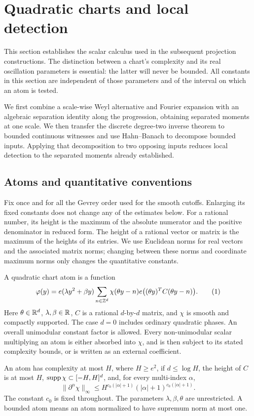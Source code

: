 \section{Quadratic charts and local detection}\label{sec:charts}

This section establishes the scalar calculus used in the subsequent
projection constructions.  The distinction between a chart's complexity
and its real oscillation parameters is essential: the latter will never
be bounded.  All constants in this section are independent of those
parameters and of the interval on which an atom is tested.

We first combine a scale-wise Weyl alternative and Fourier expansion
with an algebraic separation identity along the progression, obtaining
separated moments at one scale.  We then transfer the discrete
degree-two inverse theorem to bounded continuous witnesses and use
Hahn--Banach to decompose bounded inputs.  Applying that decomposition
to two opposing inputs reduces local detection to the separated moments
already established.

\subsection{Atoms and quantitative conventions}

Fix once and for all the Gevrey order used for the smooth cutoffs.
Enlarging its fixed constants does not change any of the estimates below.
For a rational number, its height is the maximum of the absolute
numerator and the positive denominator in reduced form.  The height of
a rational vector or matrix is the maximum of the heights of its entries.
We use Euclidean norms for real vectors and the associated matrix norms;
changing between these norms and coordinate maximum norms only changes
the quantitative constants.

\begin{definition}\label{def:quadratic-atom}
A quadratic chart atom is a function
\begin{equation*}
 \varphi(y)=e(\lambda y^2+\beta y)
 \sum_{n\in\mathbb Z^d}\chi(\theta y-n)
                 e\bigl((\theta y)^T C(\theta y-n)\bigr).
 \tag{1}\label{eq:src-1}
\end{equation*}
Here \(\theta\in\mathbb R^d\), \(\lambda,\beta\in\mathbb R\), \(C\) is a rational
\(d\)-by-\(d\) matrix, and \(\chi\) is smooth and compactly supported.
The case \(d=0\) includes ordinary quadratic phases.  An overall
unimodular constant factor is allowed.  Every non-unimodular scalar
multiplying an atom is either absorbed into \(\chi\), and is then
subject to its stated complexity bounds, or is written as an external
coefficient.

An atom has complexity at most \(H\), where \(H\ge e^2\), if
\(d\le\log H\), the height of \(C\) is at most \(H\),
\(\operatorname{supp}\chi\subset[-H,H]^d\), and, for every multi-index \(\alpha\),
\[
 \|\partial^\alpha\chi\|_\infty
 \le H^{c_0(|\alpha|+1)}
          (|\alpha|+1)^{c_0(|\alpha|+1)} .
\]
The constant \(c_0\) is fixed throughout.  The parameters
\(\lambda,\beta,\theta\) are unrestricted.
A bounded atom means an atom normalized to have supremum norm at most
one.
\end{definition}

